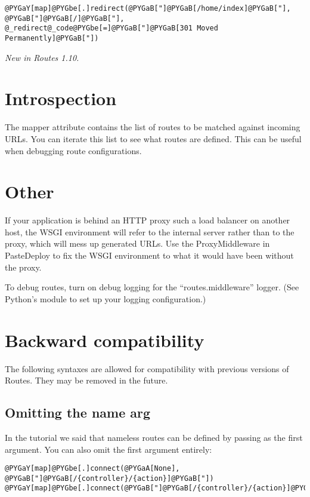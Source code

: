 \documentclass[letterpaper,10pt,english]{manual}
\begin{document}
\begin{Verbatim}[commandchars=@\[\]]
@PYGaY[map]@PYGbe[.]redirect(@PYGaB["]@PYGaB[/home/index]@PYGaB["], @PYGaB["]@PYGaB[/]@PYGaB["], @_redirect@_code@PYGbe[=]@PYGaB["]@PYGaB[301 Moved Permanently]@PYGaB["])
\end{Verbatim}

\emph{New in Routes 1.10.}


\section{Introspection}

The mapper attribute  contains the list of routes to be matched
against incoming URLs.  You can iterate this list to see what routes are
defined.  This can be useful when debugging route configurations.


\section{Other}

If your application is behind an HTTP proxy such a load balancer on another
host, the WSGI environment will refer to the internal server rather than to the
proxy, which will mess up generated URLs.  Use the ProxyMiddleware in
PasteDeploy to fix the WSGI environment to what it would have been without the
proxy.

To debug routes, turn on debug logging for the ``routes.middleware'' logger.
(See Python's  module to set up your logging configuration.)


\section{Backward compatibility}

The following syntaxes are allowed for compatibility with previous versions
of Routes.  They may be removed in the future.


\subsection{Omitting the name arg}

In the tutorial we said that nameless routes can be defined by passing 
as the first argument.  You can also omit the first argument entirely:

\begin{Verbatim}[commandchars=@\[\]]
@PYGaY[map]@PYGbe[.]connect(@PYGaA[None], @PYGaB["]@PYGaB[/{controller}/{action}]@PYGaB["])
@PYGaY[map]@PYGbe[.]connect(@PYGaB["]@PYGaB[/{controller}/{action}]@PYGaB["])
\end{Verbatim}
\end{document}
